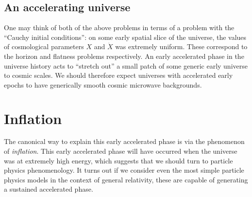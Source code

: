 \subsection{An accelerating universe}
One may think of both of the above problems in terms of a problem with the ``Cauchy initial conditions'': on some early spatial slice of the universe, the values of cosmological parameters $X$ and $\dot{X}$ was extremely uniform. These correspond to the horizon and flatness problems respectively. An early accelerated phase in the universe history acts to ``stretch out'' a small patch of some generic early universe to cosmic scales. We should therefore expect universes with accelerated early epochs to have generically smooth cosmic microwave backgrounds.

\section{Inflation}
The canonical way to explain this early accelerated phase is via the phenomenon of {\em inflation}. This early accelerated phase will have occurred when the universe was at extremely high energy, which suggests that we should turn to particle physics phenomenology.
It turns out if we consider even the most simple particle physics models in the context of general relativity, these are capable of generating a sustained accelerated phase.

